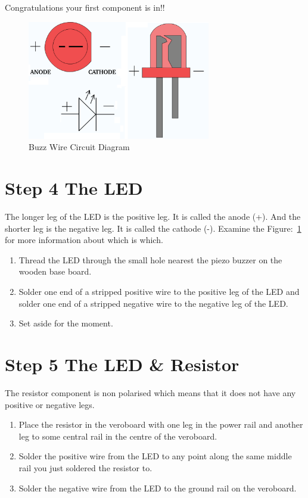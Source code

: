 Congratulations your first component is in!!

%
\begin{figure}[ht]
	\centering
	\includegraphics[width=8cm]{images/led}
	\caption{Buzz Wire Circuit Diagram}
	\label{fig:led}
\end{figure}
%


%
\section*{Step 4 The LED}

The longer leg of the LED is the positive leg. It is called the anode (+). And the shorter leg is the negative leg. It is called the cathode (-). Examine the Figure:~\ref{fig:led} for more information about which is which.

\begin{enumerate}
	\item Thread the LED through the small hole nearest the piezo buzzer on the wooden base board.
	
	\item Solder one end of a stripped positive wire to the positive leg of the LED and solder one end of a stripped negative wire to the negative leg of the LED.
	
	\item Set aside for the moment.
\end{enumerate}


%
\section*{Step 5 The LED \& Resistor}

The resistor component is non polarised which means that it does not have any positive or negative legs.

\begin{enumerate}
	\item Place the resistor in the veroboard with one leg in the power rail and another leg to some central rail in the centre of the veroboard.
	
	\item Solder the positive wire from the LED to any point along the same middle rail you just soldered the resistor to.
	
	\item Solder the negative wire from the LED to the ground rail on the veroboard.
\end{enumerate}

